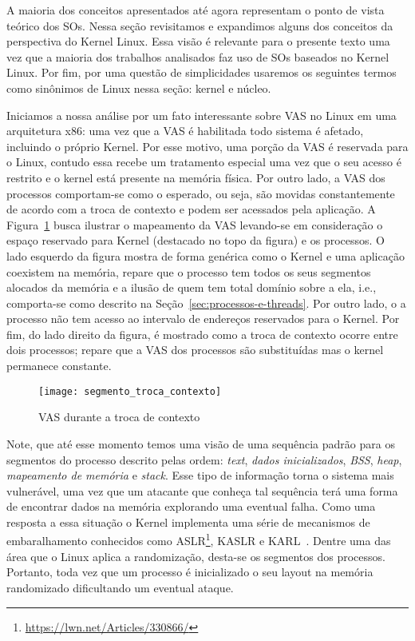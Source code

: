 A maioria dos conceitos apresentados até agora representam o ponto de vista
teórico dos SOs. Nessa seção revisitamos e expandimos alguns dos conceitos da
perspectiva do Kernel Linux. Essa visão é relevante para o presente texto uma
vez que a maioria dos trabalhos analisados faz uso de SOs baseados no Kernel
Linux. Por fim, por uma questão de simplicidades usaremos os seguintes termos
como sinônimos de Linux nessa seção: kernel e núcleo.

Iniciamos a nossa análise por um fato interessante sobre VAS no Linux em uma
arquitetura x86: uma vez que a VAS é habilitada todo sistema é afetado,
incluindo o próprio Kernel. Por esse motivo, uma porção da VAS é reservada para
o Linux, contudo essa recebe um tratamento especial uma vez que o seu acesso é
restrito e o kernel está presente na memória física. Por outro lado, a VAS dos
processos comportam-se como o esperado, ou seja, são movidas constantemente de
acordo com a troca de contexto e podem ser acessados pela aplicação. A
Figura~\ref{fig:vas_contexto} busca ilustrar o mapeamento da VAS levando-se em
consideração o espaço reservado para Kernel (destacado no topo da figura) e os
processos. O lado esquerdo da figura mostra de forma genérica como o Kernel e
uma aplicação coexistem na memória, repare que o processo tem todos os seus
segmentos alocados da memória e a ilusão de quem tem total domínio sobre a ela,
i.e., comporta-se como descrito na Seção~\ref{sec:processos-e-threads}. Por
outro lado, o a processo não tem acesso ao intervalo de endereços reservados
para o Kernel. Por fim, do lado direito da figura, é mostrado como a troca de
contexto ocorre entre dois processos; repare que a VAS dos processos são
substituídas mas o kernel permanece constante.

\begin{figure}[!h]
  \centering
  \texttt{[image: segmento\_troca\_contexto]}
  \caption{VAS durante a troca de contexto~\citep{kernel_manage_mem}}
  \label{fig:vas_contexto}
\end{figure}

Note, que até esse momento temos uma visão de uma sequência padrão para os
segmentos do processo descrito pelas ordem: \emph{text}, \emph{dados
inicializados}, \emph{BSS}, \emph{heap}, \emph{mapeamento de memória} e
\emph{stack}. Esse tipo de informação torna o sistema mais vulnerável, uma vez
que um atacante que conheça tal sequência terá uma forma de encontrar dados na
memória explorando uma eventual falha. Como uma resposta a essa situação
o Kernel implementa uma série de mecanismos de embaralhamento
conhecidos como ASLR\footnote{\url{https://lwn.net/Articles/330866/}}, KASLR e
KARL~\citep{kaslr}. Dentre uma das área que o Linux aplica a randomização,
desta-se os segmentos dos processos. Portanto, toda vez que um processo é
inicializado o seu layout na memória randomizado dificultando um eventual
ataque.


